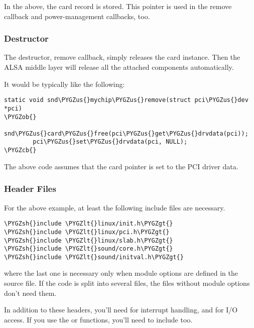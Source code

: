 \documentclass[a4paper,8pt,english]{sphinxmanual}
\def\PYGZus{\char`\_}
\def\PYGZob{\char`\{}
\def\PYGZcb{\char`\}}
\def\PYGZlt{\char`\<}
\def\PYGZgt{\char`\>}
\def\PYGZsh{\char`\#}
\begin{document}
In the above, the card record is stored. This pointer is used in the
remove callback and power-management callbacks, too.


\subsubsection{Destructor}
\label{sound/kernel-api/writing-an-alsa-driver:destructor}
The destructor, remove callback, simply releases the card instance. Then
the ALSA middle layer will release all the attached components
automatically.

It would be typically like the following:

\begin{Verbatim}[commandchars=\\\{\}]
static void snd\PYGZus{}mychip\PYGZus{}remove(struct pci\PYGZus{}dev *pci)
\PYGZob{}
        snd\PYGZus{}card\PYGZus{}free(pci\PYGZus{}get\PYGZus{}drvdata(pci));
        pci\PYGZus{}set\PYGZus{}drvdata(pci, NULL);
\PYGZcb{}
\end{Verbatim}

The above code assumes that the card pointer is set to the PCI driver
data.


\subsubsection{Header Files}
\label{sound/kernel-api/writing-an-alsa-driver:header-files}
For the above example, at least the following include files are
necessary.

\begin{Verbatim}[commandchars=\\\{\}]
\PYGZsh{}include \PYGZlt{}linux/init.h\PYGZgt{}
\PYGZsh{}include \PYGZlt{}linux/pci.h\PYGZgt{}
\PYGZsh{}include \PYGZlt{}linux/slab.h\PYGZgt{}
\PYGZsh{}include \PYGZlt{}sound/core.h\PYGZgt{}
\PYGZsh{}include \PYGZlt{}sound/initval.h\PYGZgt{}
\end{Verbatim}

where the last one is necessary only when module options are defined
in the source file. If the code is split into several files, the files
without module options don't need them.

In addition to these headers, you'll need  for
interrupt handling, and  for I/O access. If you use the
 or  functions, you'll need
to include  too.
\end{document}

